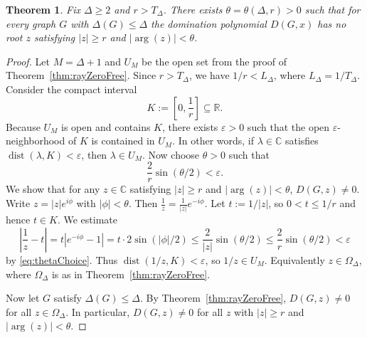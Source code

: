 \documentclass[10pt,a4paper]{amsart}
\newtheorem{theorem}{Theorem}
\DeclareMathOperator{\argu}{arg}
\newcommand{\bbC}{\mathbb{C}}
\newcommand{\bbR}{\mathbb{R}}
\DeclareMathOperator{\dist}{dist}
\begin{document}
\begin{theorem}\label{thm:angularSeparation}
Fix $\Delta\ge 2$ and $r>T_{\Delta}$. There exists $\theta=\theta(\Delta,r)>0$ such that for every graph $G$ with $\Delta(G)\le \Delta$ the domination polynomial $D(G,x)$ has no root $z$ satisfying $|z|\ge r$ and $|\argu(z)|<\theta$.
\end{theorem}

\begin{proof}
Let $M=\Delta+1$ and $U_M$ be the open set from the proof of Theorem~\ref{thm:rayZeroFree}. Since $r>T_{\Delta}$, we have $1/r<L_{\Delta}$, where $L_{\Delta}=1/T_{\Delta}$. Consider the compact interval
\[
K:=\left[0,\frac{1}{r}\right]\subseteq \bbR.
\]
Because $U_M$ is open and contains $K$, there exists $\varepsilon>0$ such that the open $\varepsilon$-neighborhood of $K$ is contained in $U_M$. In other words, if $\lambda\in\bbC$ satisfies $\dist(\lambda,K)<\varepsilon$, then $\lambda\in U_M$. Now choose $\theta>0$ such that
\begin{equation}\label{eq:thetaChoice}
\frac{2}{r}\sin(\theta/2)<\varepsilon.
\end{equation}
We show that for any $z\in\bbC$ satisfying $|z|\ge r$ and $|\argu(z)|<\theta$, $D(G,z) \neq 0$. Write $z=|z|e^{i\phi}$ with $|\phi|<\theta$. Then $\frac{1}{z}=\frac{1}{|z|}e^{-i\phi}.$ Let $t:=1/|z|$, so $0<t\le 1/r$ and hence $t\in K$. We estimate
\[
\left|\frac{1}{z}-t\right|
=t\left|e^{-i\phi}-1\right|
=t\cdot 2\sin(|\phi|/2)
\le \frac{2}{|z|}\sin(\theta/2)
\le \frac{2}{r}\sin(\theta/2)
<\varepsilon
\]
by \eqref{eq:thetaChoice}. Thus $\dist(1/z,K)<\varepsilon$, so $1/z\in U_M$. Equivalently $z\in\Omega_{\Delta}$, where $\Omega_{\Delta}$ is as in Theorem~\ref{thm:rayZeroFree}.

Now let $G$ satisfy $\Delta(G)\le \Delta$. By Theorem~\ref{thm:rayZeroFree}, $D(G,z)\neq 0$ for all $z\in\Omega_{\Delta}$. In particular, $D(G,z)\neq 0$ for all $z$ with $|z|\ge r$ and $|\argu(z)|<\theta$.
\end{proof}
\end{document}
